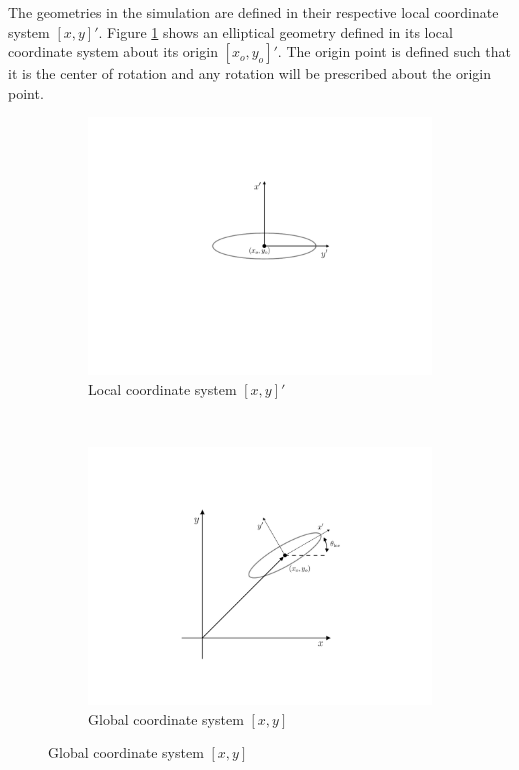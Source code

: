 The geometries in the simulation are defined in their respective local coordinate system $[x,y]'$. Figure \ref{fig:localPosition} shows an elliptical geometry defined in its local coordinate system about its origin $[{x_o},{y_o}]'$. The origin point is defined such that it is the center of rotation and any rotation will be prescribed about the origin point.

	\begin{figure}[h]
     \centering
     \begin{subfigure}[t]{0.45\textwidth}
             \includegraphics[trim=4.5cm 2.cm 3.5cm 1.5cm, clip, width=\linewidth]{./figures/hybrid/interpolation/ellipse/localOrientation.pdf}
             \caption{Local coordinate system $[x,y]'$}
             \label{fig:localPosition}
     \end{subfigure}%
     ~ %
     \begin{subfigure}[t]{0.45\textwidth}
             \includegraphics[trim=4.5cm 2.cm 3.5cm 1.5cm, clip, width=\linewidth]{./figures/hybrid/interpolation/ellipse/globalOrientation.pdf}
             \caption{Global coordinate system $[x,y]$}
             \label{fig:globalPosition}
     \end{subfigure}


\end{figure}

